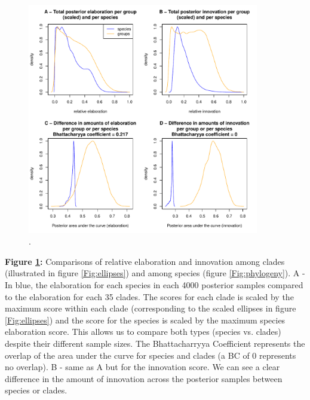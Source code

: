 \documentclass[12pt,letterpaper]{article}
\begin{document}
\begin{figure}[!htbp]
\centering
   \includegraphics[width=0.9\textwidth]{Figures/relative_EI.pdf}
\caption{.}
\label{Fig:relative_EI}
\end{figure}

\bigskip

\noindent \textbf{Figure \ref{Fig:relative_EI}:} Comparisons of relative elaboration and innovation among clades (illustrated in figure  \ref{Fig:ellipses}) and among species (figure \ref{Fig:phylogeny}).
A - In blue, the elaboration for each species in each 4000 posterior samples compared to the elaboration for each 35 clades.
The scores for each clade is scaled by the maximum score within each clade (corresponding to the scaled ellipses in figure  \ref{Fig:ellipses}) and the score for the species is scaled by the maximum species elaboration score.
This allows us to compare both types (species vs. clades) despite their different sample sizes.
The Bhattacharryya Coefficient represents the overlap of the area under the curve for species and clades (a BC of 0 represents no overlap).
B - same as A but for the innovation score.
We can see a clear difference in the amount of innovation across the posterior samples between species or clades.

\bigskip
\end{document}
